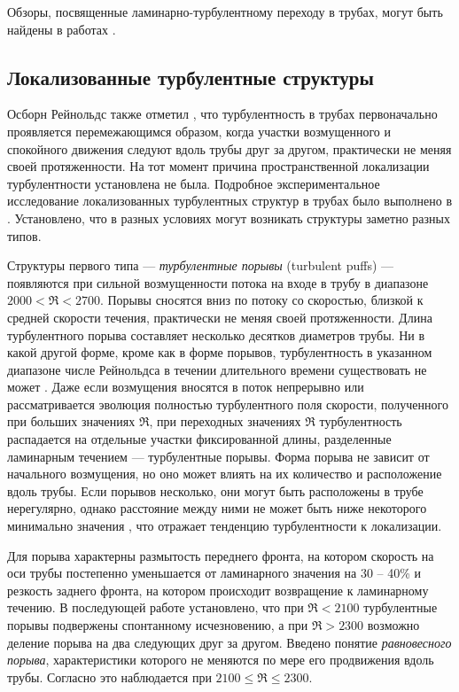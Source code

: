 Обзоры, посвященные ламинарно-турбулентному переходу в трубах, могут быть найдены в работах \cite{Kerswell2005, Manneville2016, Kreilos2014, Barkley2016}. 


	\subsection{Локализованные турбулентные структуры}

Осборн Рейнольдс также отметил \cite{Reynolds1883}, что турбулентность в трубах первоначально проявляется перемежающимся образом, когда участки возмущенного и спокойного движения следуют вдоль трубы друг за другом, практически не меняя своей протяженности. На тот момент причина пространственной локализации турбулентности установлена не была. Подробное экспериментальное исследование локализованных турбулентных структур в трубах было выполнено в \cite{Wygnanski1973}. Установлено, что в разных условиях могут возникать структуры заметно разных типов. 

Структуры первого типа --- {\it турбулентные порывы} (turbulent puffs) --- появляются при сильной возмущенности потока на входе в трубу в диапазоне $2000<\Re<2700$. Порывы сносятся вниз по потоку со скоростью, близкой к средней скорости течения, практически не меняя своей протяженности. Длина турбулентного порыва составляет несколько десятков диаметров трубы. Ни в какой другой форме, кроме как в форме порывов, турбулентность в указанном диапазоне числе Рейнольдса в течении длительного времени существовать не может \cite{vanDoorne2009, Moxey2010, Samanta2011}. Даже если возмущения вносятся в поток непрерывно или рассматривается эволюция полностью турбулентного поля скорости, полученного при больших значениях $\Re$, при переходных значениях $\Re$ турбулентность распадается на отдельные участки фиксированной длины, разделенные ламинарным течением --- турбулентные порывы. Форма порыва не зависит от начального возмущения, но оно может влиять на их количество и расположение вдоль трубы. Если порывов несколько, они могут быть расположены в трубе нерегулярно, однако расстояние между ними не может быть ниже некоторого минимально значения \cite{Samanta2011}, что отражает тенденцию турбулентности к локализации. 

Для порыва характерны размытость переднего фронта, на котором скорость на оси трубы постепенно уменьшается от ламинарного значения на 30 -- 40\% и резкость заднего фронта, на котором происходит возвращение к ламинарному течению. В последующей работе \cite{Wygnanski1975} установлено, что при $\Re<2100$ турбулентные порывы подвержены спонтанному исчезновению, а при $\Re>2300$ возможно деление порыва на два следующих друг за другом. Введено понятие {\it равновесного порыва}, характеристики которого не меняются по мере его продвижения вдоль трубы. Согласно \cite{Wygnanski1975} это наблюдается при $2100\leqslant \Re \leqslant 2300$. 

